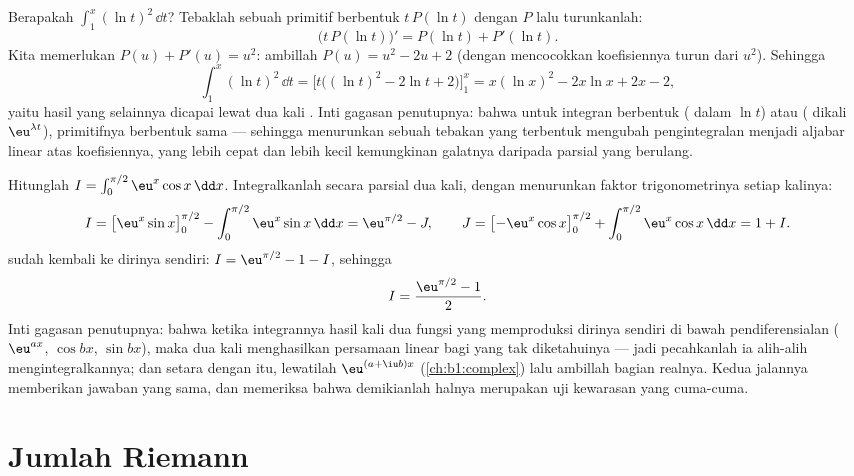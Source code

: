 \begin{example}\label{ex:b1:integration:guessdiff}
Berapakah $\int_1^x (\ln t)^2\,\dd t$? Tebaklah sebuah primitif
berbentuk $t\,P(\ln t)$ dengan $P$  lalu turunkanlah:
\[
\bigl(t\,P(\ln t)\bigr)' = P(\ln t) + P'(\ln t) .
\]
Kita memerlukan $P(u) + P'(u) = u^2$: ambillah $P(u) = u^2 - 2u + 2$
(dengan mencocokkan koefisiennya turun dari $u^2$). Sehingga
\[
\int_1^x (\ln t)^2\,\dd t
= \bigl[t\bigl((\ln t)^2 - 2\ln t + 2\bigr)\bigr]_1^x
= x(\ln x)^2 - 2x\ln x + 2x - 2 ,
\]
yaitu hasil yang selainnya dicapai lewat dua kali . Inti
gagasan penutupnya: bahwa untuk integran berbentuk
( dalam $\ln t$) atau ( dikali $\eu^{\lambda t}$),
primitifnya berbentuk sama --- sehingga menurunkan sebuah tebakan
yang terbentuk mengubah pengintegralan menjadi aljabar linear atas koefisiennya,
yang lebih cepat dan lebih kecil kemungkinan galatnya daripada parsial yang berulang.
\end{example}

\begin{example}\label{ex:b1:integration:boomerang}
Hitunglah $I = \int_0^{\pi/2} \eu^x \cos x\,\dd x$. Integralkanlah secara
parsial dua kali, dengan menurunkan faktor trigonometrinya setiap kalinya:
\[
I = \bigl[\eu^x \sin x\bigr]_0^{\pi/2}
- \int_0^{\pi/2} \eu^x \sin x\,\dd x
= \eu^{\pi/2} - J,
\qquad
J = \bigl[-\eu^x\cos x\bigr]_0^{\pi/2}
+ \int_0^{\pi/2} \eu^x\cos x\,\dd x = 1 + I .
\]
 sudah kembali ke dirinya sendiri: $I = \eu^{\pi/2} - 1 - I$,
sehingga
\[
I = \frac{\eu^{\pi/2} - 1}{2} .
\]
Inti gagasan penutupnya: bahwa ketika integrannya hasil kali dua
fungsi yang memproduksi dirinya sendiri di bawah pendiferensialan
($\eu^{ax}$, $\cos bx$, $\sin bx$), maka dua kali 
menghasilkan persamaan linear bagi  yang tak diketahuinya --- jadi pecahkanlah ia
alih-alih mengintegralkannya; dan setara dengan itu, lewatilah
$\eu^{(a + \iu b)x}$ (\cref{ch:b1:complex}) lalu ambillah bagian
realnya. Kedua jalannya memberikan jawaban yang sama, dan memeriksa bahwa demikianlah
halnya merupakan uji kewarasan yang cuma-cuma.
\end{example}

\section{Jumlah Riemann}

